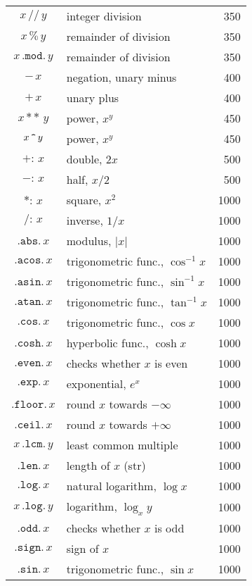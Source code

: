 \documentclass[11pt,a4paper]{refrep}
\begin{document}
\begin{description}
\begin{center}
\begin{longtable}{|c|p{12em}|r|}
   $x\,\mathtt{//}\,y$ & integer division & 350\\
   $x\,\mathtt{\%}\,y$ & remainder of division & 350\\
   $x\,\mathtt{.mod.}\,y$ & remainder of division & 350\\
   $\mathtt{-}\,x$ & negation, unary minus & 400\\
   $\mathtt{+}\,x$ & unary plus & 400\\
   $x\,\mathtt{**}\,y$ & power, $x^y$ & 450\\
   $x\,\text{\tt\textasciicircum}\,y$ & power, $x^y$ & 450\\
   $\mathtt{+:}\,x$ & double, $2x$ & 500\\
   $\mathtt{-:}\,x$ & half, $x/2$ & 500\\
   $\mathtt{*:}\,x$ & square, $x^2$ & 1000\\
   $\mathtt{/:}\,x$ & inverse, $1/x$ & 1000\\
   $\mathtt{.abs.}\,x$ & modulus, $\vert x\vert$ & 1000\\
   $\mathtt{.acos.}\,x$ & trigonometric func., $\cos^{-1} x$ & 1000\\
   $\mathtt{.asin.}\,x$ & trigonometric func., $\sin^{-1} x$ & 1000\\
   $\mathtt{.atan.}\,x$ & trigonometric func., $\tan^{-1} x$ & 1000\\
   $\mathtt{.cos.}\,x$ & trigonometric func., $\cos x$ & 1000\\
   $\mathtt{.cosh.}\,x$ & hyperbolic func., $\cosh x$ & 1000\\
   $\mathtt{.even.}\,x$ & checks whether $x$ is even & 1000\\
   $\mathtt{.exp.}\,x$ & exponential, $e^x$ & 1000\\
   $\mathtt{.floor.}\,x$ & round $x$ towards $-\infty$ & 1000\\
   $\mathtt{.ceil.}\,x$ & round $x$ towards $+\infty$ & 1000\\
   $x\,\mathtt{.lcm.}\,y$ & least common multiple & 1000\\
   $\mathtt{.len.}\,x$ & length of $x$ (str) & 1000\\
   $\mathtt{.log.}\,x$ & natural logarithm, $\log x$ & 1000\\
   $x\,\mathtt{.log.}\,y$ & logarithm, $\log_x y$ & 1000\\
   $\mathtt{.odd.}\,x$ & checks whether $x$ is odd & 1000\\
   $\mathtt{.sign.}\,x$ & sign of $x$ & 1000\\
   $\mathtt{.sin.}\,x$ & trigonometric func., $\sin x$ & 1000\\

\end{longtable}
\end{center}
\end{description}
\end{document}
